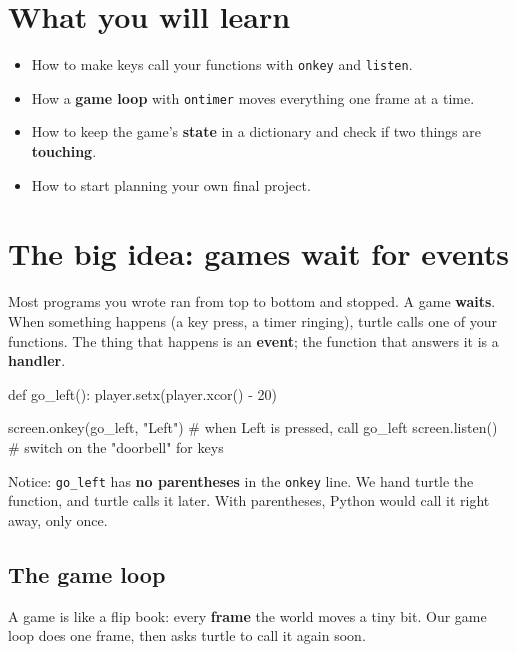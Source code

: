 
\section{What you will learn}
\begin{itemize}[leftmargin=1.2em]
  \item How to make keys call your functions with \texttt{onkey} and \texttt{listen}.
  \item How a \textbf{game loop} with \texttt{ontimer} moves everything one frame at a time.
  \item How to keep the game's \textbf{state} in a dictionary and check if two things are \textbf{touching}.
  \item How to start planning your own final project.
\end{itemize}

\section{The big idea: games wait for events}
Most programs you wrote ran from top to bottom and stopped. A game \textbf{waits}. When something happens (a key press, a timer ringing),
turtle calls one of your functions. The thing that happens is an \textbf{event}; the function that answers it is a \textbf{handler}.

\begin{pycode}
def go_left():
    player.setx(player.xcor() - 20)

screen.onkey(go_left, "Left")   # when Left is pressed, call go_left
screen.listen()                 # switch on the "doorbell" for keys
\end{pycode}
Notice: \texttt{go\_left} has \textbf{no parentheses} in the \texttt{onkey} line. We hand turtle the function, and turtle calls it later.
With parentheses, Python would call it right away, only once.

\subsection{The game loop}
A game is like a flip book: every \textbf{frame} the world moves a tiny bit. Our game loop does one frame, then asks turtle to call it again soon.

